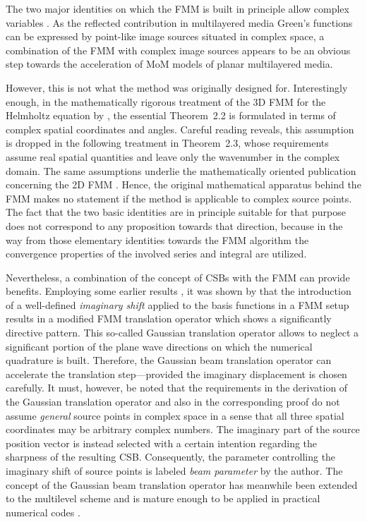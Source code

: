 The two major identities on which the \ac{FMM} is built in principle allow
complex variables \cite{Olver2010}.
As the reflected contribution in multilayered media Green's functions can
be expressed by point-like image sources situated in complex space,
a combination of the \ac{FMM} with complex image sources appears to be an
obvious step towards the acceleration of \ac{MoM} models of planar multilayered
media.

However, this is not what the method was originally designed for.
Interestingly enough, in the mathematically rigorous treatment of the 3D
\ac{FMM} for the Helmholtz equation by \textcite{Rokhlin1993}, the essential
Theorem~2.2 is formulated in terms of complex spatial coordinates and angles.
Careful reading reveals, this assumption is dropped in the following
treatment in Theorem~2.3, whose requirements assume real spatial quantities
and leave only the wavenumber in the complex domain.
The same assumptions underlie the mathematically oriented publication concerning
the 2D \ac{FMM} \cite{Rokhlin1990}.
Hence, the original mathematical apparatus behind the \ac{FMM} makes no
statement if the method is applicable to complex source points.
The fact that the two basic identities are in principle suitable for that
purpose does not correspond to any proposition towards that direction, because
in the way from those elementary identities towards the \ac{FMM} algorithm
the convergence properties of the involved series and integral are utilized.

Nevertheless, a combination of the concept of \acp{CSB} with the \ac{FMM} can
provide benefits.
Employing some earlier results \cite{Hansen2009}, it was shown by
\textcite{Hansen2013} that the introduction of a well-defined
\emph{imaginary shift} applied to the basis functions in a \ac{FMM} setup
results in a modified \ac{FMM} translation operator which shows a significantly
directive pattern.
This so-called Gaussian translation operator allows to neglect a significant
portion of the plane wave directions on which the numerical quadrature is built.
Therefore, the Gaussian beam translation operator can accelerate the 
translation step---provided the imaginary displacement is chosen carefully.
It must, however, be noted that the requirements in the derivation of the
Gaussian translation operator and also in the corresponding proof 
\cite[Appendix]{Hansen2013} do not assume \emph{general} source points in
complex space in a sense that all three spatial coordinates may be arbitrary
complex numbers.
The imaginary part of the source position vector is instead selected with a
certain intention regarding the sharpness of the resulting \ac{CSB}.
Consequently, the parameter controlling the imaginary shift of source points
is labeled \emph{beam parameter} by the author.
The concept of the Gaussian beam translation operator has meanwhile been
extended to the multilevel scheme \cite{Borries2014} and is mature enough
to be applied in practical numerical codes \cite{eibert2021}.

